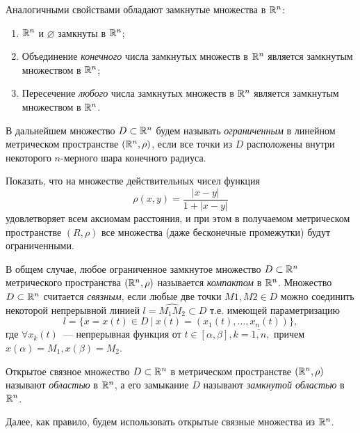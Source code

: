 \documentclass[../../main.tex]{subfiles}
\begin{document}
  Аналогичными свойствами обладают замкнутые множества в $\mathbb{R}^n$:
  \begin{enumerate}
    \item  $\mathbb{R}^n$  и $\varnothing$ замкнуты в $\mathbb{R}^n$;
    \item Объединение \emph{конечного}  числа замкнутых множеств в 
    $\mathbb{R}^n$ является замкнутым множеством в $\mathbb{R}^n$; 
    \item Пересечение \emph{любого} числа замкнутых множеств в $\mathbb{R}^n$ 
    является замкнутым множеством в $\mathbb{R}^n$.
  \end{enumerate} 
  
  
  В дальнейшем множество $D \subset \mathbb{R}^n$ будем называть 
  \emph{ограниченным} в линейном метрическом пространстве $ (\mathbb{R}^n, \rho) $, 
  если все точки из $D$ расположены внутри некоторого $n$-мерного шара 
  конечного радиуса.
  
  \begin{exc}
    Показать, что на множестве действительных чисел функция 
    \[ 
      \rho(x, y) = \frac{|x - y|}{1 + |x - y|}
    \] удовлетворяет всем аксиомам расстояния, и при этом в 
    получаемом метрическом пространстве $ (R, \rho) $ все множества 
    (даже бесконечные промежутки) будут ограниченными.   
   \end{exc} 
 
  \smallskip   
  В общем случае, любое ограниченное замкнутое множество $D \subset 
  \mathbb{R}^n$ метрического пространства $ (\mathbb{R}^n, \rho) $ называется 
  \emph{компактом} в $\mathbb{R}^n$.
  Множество $D \subset \mathbb{R}^n$ считается \emph{связным}, если любые две точки 
  $M1,M2 \in D $ можно соединить некоторой непрерывной линией $ l = 
  \widehat{M_1M_2} \subset D$  
  т.е. имеющей параметризацию
  \[
    l = \{x = x(t) \in D\ |\ x(t) = (x_1(t), \dots, x_n(t))\},
  \]
  где $\forall x_k(t)$~--- непрерывная функция от $t \in [\alpha, 
  \beta], k = \overline{1,n},$ причем $ x(\alpha) = M_1, x(\beta) = 
  M_2.$
   
  Открытое связное множество $D \subset \mathbb{R}^n$ в метрическом 
  пространстве $ (\mathbb{R}^n, \rho) $ называют \emph{областью} в $\mathbb{R}^n$, а 
  его замыкание $D$ называют \emph{замкнутой областью} в $\mathbb{R}^n$.
   
  Далее, как правило, будем использовать открытые связные множества 
  из $\mathbb{R}^n$.
  
\end{document}
